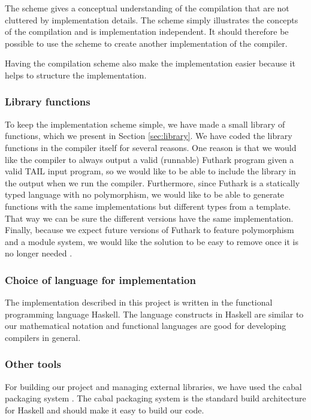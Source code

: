 \documentclass[11pt]{article}
\begin{document}
The scheme gives a conceptual understanding of the compilation that are not cluttered by implementation details.
The scheme simply illustrates the concepts of the compilation and is implementation independent.
It should therefore be possible to use the scheme to create another implementation of the compiler.

Having the compilation scheme also make the implementation easier because it helps to structure the implementation. 

\subsubsection{Library functions}
To keep the implementation scheme simple, we have made a small library of functions, which we present in Section \ref{sec:library}.
We have coded the library functions in the compiler itself for several reasons.
One reason is that we would like the compiler to always output a valid (runnable) Futhark program given a valid TAIL input program, so we would like to be able to include the library in the output when we run the compiler.
Furthermore, since Futhark is a statically typed language with no polymorphism, we would like to be able to
generate functions with the same implementations but different types from a template.
That way we can be sure the different versions have the same implementation.
Finally, because we expect future versions of  Futhark to feature polymorphism and a module system, we would like the solution to be easy to remove once it is no longer needed \cite{TroelsHenriksen}. 

\subsubsection{Choice of language for implementation}
The implementation described in this project is written in the functional programming language Haskell.
The language constructs in Haskell are similar to our mathematical notation and functional languages are good for developing compilers in general\cite{TorbenMogensen}.

\subsubsection{Other tools}
For building our project and managing external libraries, we have used the cabal packaging system \cite{cabal}.
The cabal packaging system is the standard build architecture for Haskell and should make it easy to build our code.
\end{document}

